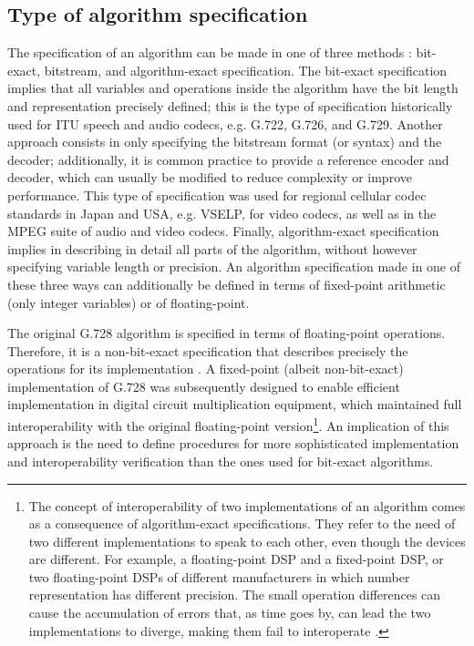 \subsection{Type of algorithm specification}

The specification of an algorithm can be made in one of three
methods \cite{LDCELP-VerProc}: bit-exact, bitstream, and algorithm-exact
specification. The bit-exact specification implies that all variables
and operations inside the algorithm have the bit length and
representation precisely defined; this is the type of specification
historically used for ITU speech and audio codecs, e.g. G.722, G.726, and
G.729. Another approach consists in only specifying the bitstream
format (or syntax) and the decoder; additionally, it is common
practice to provide a reference encoder and decoder, which can usually
be modified to reduce complexity or improve performance. This type of
specification was used for regional cellular codec standards in Japan
and USA, e.g. VSELP, for video codecs, as well as in the MPEG suite
of audio and video codecs. Finally, algorithm-exact
specification implies in describing in detail all parts of the
algorithm, without however specifying variable length or precision. An
algorithm specification made in one of these three ways can additionally
be defined in terms of fixed-point arithmetic (only integer variables)
or of floating-point. 

The original G.728 algorithm is specified in terms of floating-point
operations. Therefore, it is a non-bit-exact specification that
describes precisely the operations for its implementation 
\cite{LDCELP-VerProc}. A fixed-point (albeit non-bit-exact)
implementation of G.728 was subsequently designed to enable efficient
implementation in digital circuit multiplication equipment, which
maintained full interoperability with the original floating-point
version\footnote{\sf The concept of interoperability of two
 implementations of an algorithm comes as a consequence of
 algorithm-exact specifications. They refer to the need of two
 different implementations to speak to each other, even though the
 devices are different. For example, a floating-point DSP and a
 fixed-point DSP, or two floating-point DSPs of different
 manufacturers in which number representation has different
 precision. The small operation differences can cause the
 accumulation of errors that, as time goes by, can lead the two
 implementations to diverge, making them fail to interoperate
 \cite{LDCELP-VerProc}.}. An implication of this approach is the need
to define procedures for more sophisticated implementation and
interoperability verification than the ones used for bit-exact
algorithms.

